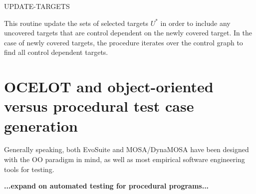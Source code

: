 \begin{algorithm}[H]
    \caption{UPDATE-TARGETS}


    \DontPrintSemicolon   

    
     {
    }
\end{algorithm}

This routine update the sets of selected targets $ U^* $ in order to include any uncovered targets that are control dependent on the newly covered target.
In the case of newly covered targets, the procedure iterates over the control graph to find all control dependent targets.





\newpage
\section{OCELOT and object-oriented versus procedural test case generation}
Generally speaking, both EvoSuite and MOSA/DynaMOSA have been designed with the OO paradigm in mind, as well as most empirical software engineering tools for testing.

\textbf{...expand on automated testing for procedural programs...}

